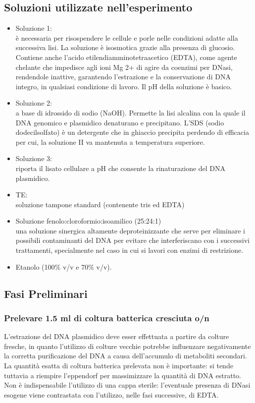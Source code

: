 \documentclass{extarticle}
\begin{document}
\subsection*{Soluzioni utilizzate nell'esperimento}
\begin{itemize}
    \item Soluzione 1:\\
    è necessaria per risospendere le cellule e porle nelle condizioni adatte alla successiva lisi. La soluzione è isosmotica grazie alla presenza di glucosio. Contiene anche l'acido etilendiamminotetraacetico (EDTA), come agente chelante che impedisce agli ioni Mg 2+ di agire da coenzimi per DNasi, rendendole inattive, garantendo l'estrazione e la conservazione di DNA integro, in qualsiasi condizione di lavoro. Il pH della soluzione è basico.
    \item Soluzione 2:\\
    a base di idrossido di sodio (NaOH). Permette la lisi alcalina con la quale il DNA genomico e plasmidico denaturano e precipitano. L'SDS (sodio dodecilsolfato) è un detergente che in ghiaccio precipita perdendo di efficacia per cui, la soluzione II va mantenuta a temperatura superiore.
    \item Soluzione 3:\\
    riporta il lisato cellulare a pH che consente la rinaturazione del DNA plasmidico.
    \item TE:\\soluzione tampone standard (contenente tris ed EDTA)
    \item Soluzione fenolo:cloroformio:isoamilico (25:24:1)\\ una soluzione sinergica altamente deproteinizzante che serve per eliminare i possibili contaminanti del DNA per evitare che interferiscano con i successivi trattamenti, specialmente nel caso in cui si lavori con enzimi di restrizione.
    \item Etanolo (100$\%$ v/v e 70$\%$ v/v).
\end{itemize}
\subsection*{Fasi Preliminari}
\subsubsection*{Prelevare 1.5 ml di coltura batterica cresciuta o/n} L'estrazione del DNA plasmidico deve esser effettuata a partire da colture fresche, in quanto l'utilizzo di colture vecchie potrebbe influenzare negativamente la corretta purificazione del DNA a causa dell'accumulo di metaboliti secondari. La quantità esatta di coltura batterica prelevata non è importante: si tende tuttavia a riempire l'eppendorf per massimizzare la quantità di DNA estratto. Non è indispensabile l'utilizzo di una cappa sterile: l'eventuale presenza di DNasi esogene viene contrastata con l'utilizzo, nelle fasi successive, di EDTA.
\end{document}
